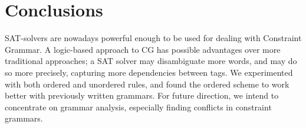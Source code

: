 
\section{Conclusions}

SAT-solvers are nowadays powerful enough to be used for dealing with
Constraint Grammar. A logic-based approach to CG has possible
advantages over more traditional approaches; a SAT solver may
disambiguate more words, and may do so more precisely, capturing
more dependencies between tags.
We experimented with both ordered and unordered rules, and found the 
ordered scheme to work better with previously written grammars.
For future direction, we intend to concentrate on grammar analysis,
especially finding conflicts in constraint grammars.



